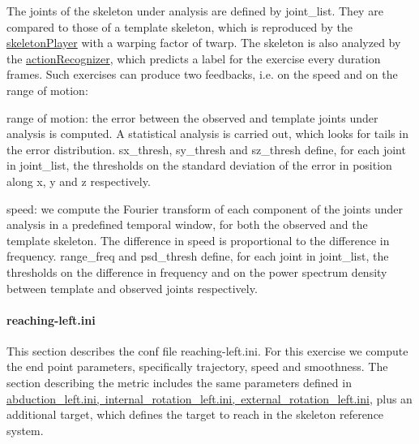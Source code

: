 The joints of the skeleton under analysis are defined by {\ttfamily joint\+\_\+list}. They are compared to those of a template skeleton, which is reproduced by the \mbox{\hyperlink{group__skeletonPlayer}{skeleton\+Player}} with a warping factor of {\ttfamily twarp}. The skeleton is also analyzed by the \mbox{\hyperlink{group__actionRecognizer}{action\+Recognizer}}, which predicts a label for the exercise every {\ttfamily duration} frames. Such exercises can produce two feedbacks, i.\+e. on the speed and on the range of motion\+:


\begin{DoxyItemize}
\item range of motion\+: the error between the observed and template joints under analysis is computed. A statistical analysis is carried out, which looks for tails in the error distribution. {\ttfamily sx\+\_\+thresh}, {\ttfamily sy\+\_\+thresh} and {\ttfamily sz\+\_\+thresh} define, for each joint in {\ttfamily joint\+\_\+list}, the thresholds on the standard deviation of the error in position along x, y and z respectively.
\item speed\+: we compute the Fourier transform of each component of the joints under analysis in a predefined temporal window, for both the observed and the template skeleton. The difference in speed is proportional to the difference in frequency. {\ttfamily range\+\_\+freq} and {\ttfamily psd\+\_\+thresh} define, for each joint in {\ttfamily joint\+\_\+list}, the thresholds on the difference in frequency and on the power spectrum density between template and observed joints respectively.
\end{DoxyItemize}\hypertarget{group__motionAnalyzer_sec-reaching}{}\paragraph{reaching-\/left.\+ini}\label{group__motionAnalyzer_sec-reaching}
This section describes the conf file reaching-\/left.\+ini. For this exercise we compute the end point parameters, specifically trajectory, speed and smoothness. The section describing the metric includes the same parameters defined in \mbox{\hyperlink{group__motionAnalyzer_sec-abduction}{abduction\+\_\+left.\+ini, internal\+\_\+rotation\+\_\+left.\+ini, external\+\_\+rotation\+\_\+left.\+ini}}, plus an additional {\ttfamily target}, which defines the target to reach in the skeleton reference system.


\begin{DoxyCode}{0}
\DoxyCodeLine{[EP\_0]}
\end{DoxyCode}


